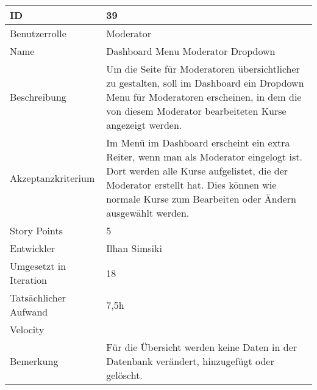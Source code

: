 \begin{tabularx}{\textwidth}{|p{}|X|}
	\hline
	ID & 39 \\
	\hline
	Benutzerrolle & Moderator \\
	\hline
	Name & Dashboard Menu Moderator Dropdown\\
	\hline
	Beschreibung & Um die Seite für Moderatoren übersichtlicher zu gestalten, soll im Dashboard ein Dropdown Menu für Moderatoren erscheinen, in dem die von diesem Moderator bearbeiteten Kurse angezeigt werden. \\
	\hline
	Akzeptanzkriterium & Im Menü im Dashboard erscheint ein extra Reiter, wenn man als Moderator eingelogt ist. Dort werden alle Kurse aufgelistet, die der Moderator erstellt hat. Dies können wie normale Kurse zum Bearbeiten oder Ändern ausgewählt werden. \\
	\hline
	Story Points & 5\\
	\hline
	Entwickler & Ilhan Simsiki\\
	\hline
	Umgesetzt in Iteration & 18\\
	\hline
	Tatsächlicher Aufwand & 7,5h \\
	\hline
	Velocity & \\
	\hline
	Bemerkung & Für die Übersicht werden keine Daten in der Datenbank verändert, hinzugefügt oder gelöscht.\\
	\hline
\end{tabularx}
\vspace{20pt}
